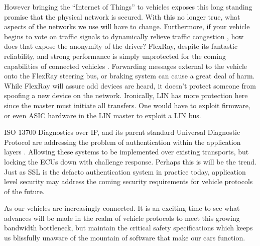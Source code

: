 \documentclass[conference,12pt]{IEEEtran}
\begin{document}
However bringing the ``Internet of Things'' to vehicles exposes this long
standing promise that the physical network is secured. With this no longer true,
what aspects of the networks we use will have to change. Furthermore, if your
vehicle begins to vote on traffic signals to dynamically relieve traffic
congestion \autocite{nafi_vanet_2012}, how does that expose the anonymity of
the driver? 
FlexRay, despite its fantastic reliability, and strong performance is simply
unprotected for the coming capabilities of connected vehicles
\autocite{kleberger_security_2011}. Forwarding messages external to the vehicle
onto the FlexRay steering bus, or braking system can cause a great deal of harm.
While FlexRay will assure add devices are heard, it doesn't protect someone from
spoofing a new device on the network. Ironically, LIN has more protection here
since the master must initiate all transfers.  One would have to exploit
firmware, or even ASIC hardware in the LIN master to exploit a LIN bus.  

ISO 13700 Diagnostics over IP, and its parent standard Universal
Diagnostic Protocol are addressing the problem of authentication within the
application layers \autocite{std_doip}. Allowing these systems to be implemented over existing
transports, but locking the ECUs down with challenge response.  Perhaps this is
will be the trend. Just as SSL is the defacto authentication system in practice
today, application level security may address the coming security requirements
for vehicle protocols of the future. 

As our vehicles are increasingly connected. It is an exciting time to see what
advances will be
made in the realm of vehicle protocols to meet this growing bandwidth bottleneck,
but maintain the critical safety specifications which keeps us blissfully unaware
of the mountain of software that make our cars function. 

\printbibliography
\end{document}
